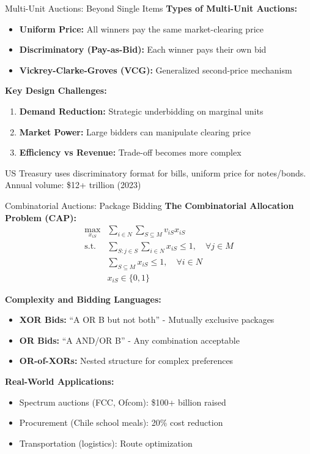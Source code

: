 \documentclass[xcolor={x11names}]{beamer}
\begin{document}
\begin{frame}{Multi-Unit Auctions: Beyond Single Items}
\textbf{Types of Multi-Unit Auctions:}
\begin{itemize}
  \item \textbf{Uniform Price:} All winners pay the same market-clearing price
  \item \textbf{Discriminatory (Pay-as-Bid):} Each winner pays their own bid
  \item \textbf{Vickrey-Clarke-Groves (VCG):} Generalized second-price mechanism
\end{itemize}


\textbf{Key Design Challenges:}
\begin{enumerate}
  \item \textbf{Demand Reduction:} Strategic underbidding on marginal units
  \item \textbf{Market Power:} Large bidders can manipulate clearing price
  \item \textbf{Efficiency vs Revenue:} Trade-off becomes more complex
\end{enumerate}


\begin{tcolorbox}[colback=blue!5!white,colframe=blue!75!black,title=Treasury Auction Example]
US Treasury uses discriminatory format for bills, uniform price for notes/bonds. 
Annual volume: \$12+ trillion (2023)
\end{tcolorbox}
\end{frame}

\begin{frame}{Combinatorial Auctions: Package Bidding}
\textbf{The Combinatorial Allocation Problem (CAP):}
\begin{align}
\max_{x_{iS}} & \sum_{i \in N} \sum_{S \subseteq M} v_{iS} x_{iS} \\
\text{s.t. } & \sum_{S: j \in S} \sum_{i \in N} x_{iS} \leq 1, \quad \forall j \in M \\
& \sum_{S \subseteq M} x_{iS} \leq 1, \quad \forall i \in N \\
& x_{iS} \in \{0,1\}
\end{align}

\textbf{Complexity and Bidding Languages:}
\begin{itemize}
  \item \textbf{XOR Bids:} ``A OR B but not both'' - Mutually exclusive packages
  \item \textbf{OR Bids:} ``A AND/OR B'' - Any combination acceptable
  \item \textbf{OR-of-XORs:} Nested structure for complex preferences
\end{itemize}

\textbf{Real-World Applications:}
\begin{itemize}
  \item Spectrum auctions (FCC, Ofcom): \$100+ billion raised
  \item Procurement (Chile school meals): 20\% cost reduction
  \item Transportation (logistics): Route optimization
\end{itemize}
\end{frame}
\end{document}
